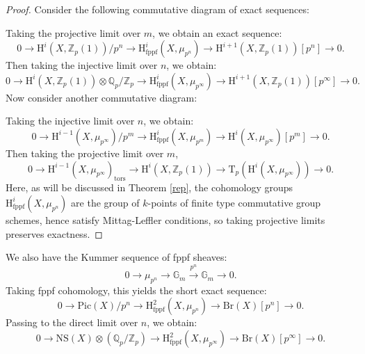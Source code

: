 \documentclass[a4paper,12pt,twoside]{report}
\newcommand{\Q}{\mathbb{Q}}
\newcommand{\Z}{\mathbb{Z}}
\newcommand{\G}{\mathbb{G}}
\newcommand{\fppf}{\mathrm{fppf}}
\newcommand{\Pic}{\mathrm{Pic}}
\newcommand{\Br}{\mathrm{Br}}
\newcommand{\NS}{\mathrm{NS}}
\newcommand{\HH}{\mathrm{H}}
\newcommand{\T}{\mathrm{T}}
\begin{document}
\begin{proof}
    Consider the following commutative diagram of exact sequences: 
\begin{center}
\end{center}
Taking the projective limit over $m$, we obtain an exact sequence: 
\[0\rightarrow \HH^i(X,\Z_p(1))/p^n\rightarrow \HH^i_{\fppf}(X,\mu_{p^n}) \rightarrow\HH^{i+1}(X,\Z_p(1))[p^n]\rightarrow 0.\]
Then taking the injective limit over $n$, we obtain:
\[0\rightarrow \HH^i(X,\Z_p(1))\otimes \Q_p/\Z_p \rightarrow \HH^i_{\fppf}(X,\mu_{p^\infty})\rightarrow \HH^{i+1}(X,\Z_p(1))[p^\infty]\rightarrow 0.\]
Now consider another commutative diagram: 
\begin{center}
\end{center}
Taking the injective limit over $n$, we obtain:
\[0\rightarrow \HH^{i-1}(X,\mu_{p^\infty})/p^m\rightarrow \HH^i_{\fppf}(X,\mu_{p^m}) \rightarrow\HH^{i}(X,\mu_{p^\infty})[p^m]\rightarrow 0.\]
Then taking the projective limit over $m$, 
\[0\rightarrow  \HH^{i-1}(X,\mu_{p^\infty})_{\mathrm{tors}}\rightarrow \HH^i(X,\Z_p(1))\rightarrow \T_p(\HH^{i}(X,\mu_{p^\infty}))\rightarrow 0.\]
Here, as will be discussed in Theorem \ref{rep}, the cohomology groups $\HH^i_{\fppf}(X,\mu_{p^n})$ are the group of $k$-points of finite type commutative group schemes, 
hence satisfy Mittag-Leffler conditions, so taking projective limits preserves exactness. 
\end{proof} 

We also have the Kummer sequence of fppf sheaves: 
\[0\rightarrow \mu_{p^n} \rightarrow \G_m \xrightarrow{p^n} \G_m\rightarrow 0.\]
Taking fppf cohomology, this yields the short exact sequence: 
\[0\rightarrow \Pic(X)/p^n\rightarrow \HH^2_{\fppf}(X,\mu_{p^n})\rightarrow \Br(X)[p^n] \rightarrow 0.\]
Passing to the direct limit over $n$, we obtain:
\[0\rightarrow \NS(X)\otimes (\Q_p/\Z_p) \rightarrow \HH^2_{\fppf}(X,\mu_{p^\infty}) \rightarrow \Br(X)[p^\infty]\rightarrow 0.\]
\end{document}
